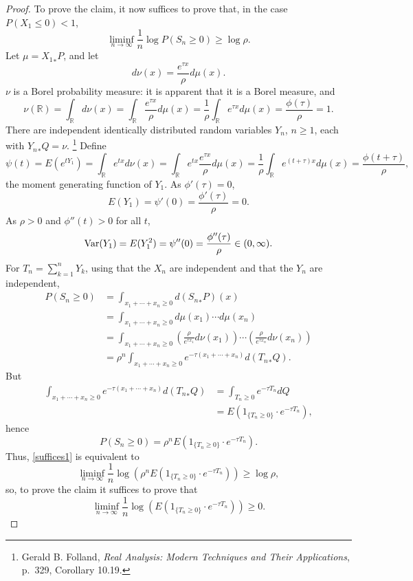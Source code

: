 \documentclass{article}
\newcommand{\Var}{\ensuremath\mathrm{Var}}
\theoremstyle{definition}
\theoremstyle{definition}
\begin{document}
\begin{proof}
To prove the claim, it now suffices to prove that, in the case $P(X_1 \leq 0)<1$, 
\begin{equation}
\liminf_{n \to \infty} \frac{1}{n} \log P(S_n \geq 0) \geq \log \rho.
\label{suffices1}
\end{equation}
Let $\mu = {X_1}_*P$, and 
let
\[
d\nu(x) = \frac{e^{\tau x}}{\rho} d\mu(x).
\]
$\nu$ is a Borel probability measure: it is apparent that it is a Borel measure, and
\[
\nu(\mathbb{R}) = \int_\mathbb{R} d\nu(x) = \int_\mathbb{R}  \frac{e^{\tau x}}{\rho} d\mu(x)
=\frac{1}{\rho} \int_\mathbb{R} e^{\tau x} d\mu(x)
=\frac{\phi(\tau)}{\rho} =1.
\]
There are independent identically distributed random variables $Y_n$, $n \geq 1$,
each with ${Y_n}_*Q = \nu$.
\footnote{Gerald B. Folland, {\em Real Analysis: Modern Techniques and
Their Applications}, p.~329, Corollary 10.19.}
Define
\[
\psi(t) = E(e^{tY_1}) = \int_\mathbb{R} e^{tx} d\nu(x)
=\int_\mathbb{R} e^{tx} \frac{e^{\tau x}}{\rho} d\mu(x)
=\frac{1}{\rho} \int_\mathbb{R} e^{(t+\tau)x} d\mu(x)
=\frac{\phi(t+\tau)}{\rho},
\]
the moment generating function of $Y_1$.
As $\phi'(\tau)=0$,
\[
E(Y_1) = \psi'(0) = \frac{\phi'(\tau)}{\rho} = 0.
\]
As $\rho>0$ and $\phi''(t)>0$ for all $t$,
\[
\Var(Y_1) = E(Y_1^2) = \psi''(0) = \frac{\phi''(\tau)}{\rho} \in (0,\infty).
\]
For $T_n=\sum_{k=1}^n Y_k$,
using that the $X_n$ are independent and that the $Y_n$ are independent,
\begin{align*}
P(S_n \geq 0) &= \int_{x_1 + \cdots +x_n \geq 0} d({S_n}_*P)(x)\\
&=\int_{x_1+\cdots+x_n \geq 0} d\mu(x_1) \cdots d\mu(x_n)\\
&=\int_{x_1+\cdots+x_n \geq 0} \left(\frac{\rho}{e^{\tau x_1}} d\nu(x_1) \right) 
\cdots \left( \frac{\rho}{e^{\tau x_n}} d\nu(x_n) \right)\\
&=\rho^n \int_{x_1+\cdots+x_n \geq 0} e^{-\tau(x_1+\cdots+x_n)} d({T_n}_*Q).
\end{align*}
But
\begin{align*}
\int_{x_1+\cdots+x_n \geq 0} e^{-\tau(x_1+\cdots+x_n)} d({T_n}_*Q)&= 
\int_{T_n \geq 0} e^{-\tau T_n} dQ\\
&=E(1_{\{T_n \geq 0\}} \cdot e^{-\tau T_n}),
\end{align*}
hence
\[
P(S_n \geq 0) = \rho^n E(1_{\{T_n \geq 0\}} \cdot e^{-\tau T_n}).
\]
Thus,   \eqref{suffices1} is equivalent to
\[
\liminf_{n \to \infty} \frac{1}{n} \log \left(  \rho^n E(1_{\{T_n \geq 0\}} \cdot e^{-\tau T_n}) \right) \geq \log \rho,
\]
so, to prove the claim it suffices to prove that
\[
\liminf_{n \to \infty} \frac{1}{n} \log\left( E(1_{\{T_n \geq 0\}} \cdot e^{-\tau T_n})\right) \geq 0.
\]
\end{proof}
\end{document}
